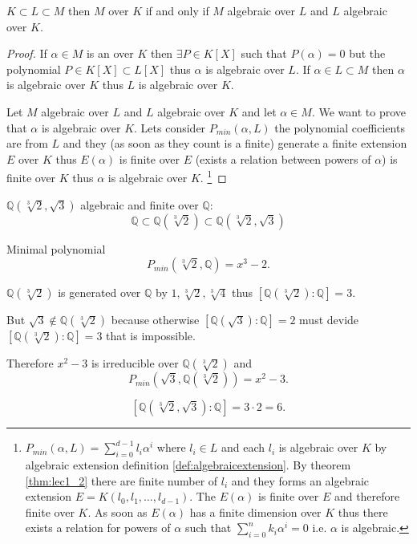 \begin{theorem}
  $K \subset L \subset M$ then $M$ 
  over $K$ if and only if $M$ algebraic over $L$ and $L$ algebraic
  over $K$. 
  \begin{proof}
    If $\alpha \in M$ is an  over $K$ then
    $\exists P \in K\left[X\right]$ such that
    $P\left(\alpha\right) = 0$ but the
    polynomial $P \in K\left[X\right] \subset L\left[X\right]$
    thus $\alpha$ is algebraic over $L$.
    If $\alpha \in L \subset M$ then $\alpha$ is algebraic over $K$
    thus $L$ is algebraic over $K$.

    Let $M$ algebraic over $L$ and $L$ algebraic over $K$ and let
    $\alpha \in M$. We want to prove that $\alpha$ is algebraic over
    $K$. Lets consider $P_{min}\left(\alpha, L\right)$ the polynomial
    coefficients are from $L$ and they (as soon as they count is a
    finite)  generate a finite extension $E$ over $K$ thus
    $E\left(\alpha\right)$ is finite over $E$ (exists a relation
    between powers of $\alpha$) is finite over $K$ thus $\alpha$ is
    algebraic over $K$.
    \footnote{
      $P_{min}\left(\alpha, L\right) = \sum_{i = 0}^{d-1} l_i
      \alpha^i$ where $l_i \in L$ and each $l_i$ is algebraic over $K$
      by algebraic extension definition
      \ref{def:algebraicextension}. By theorem
      \ref{thm:lec1_2} there are finite number of $l_i$
      and they forms an algebraic extension
      $E = K\left(l_0, l_1, \dots, l_{d-1}\right)$. The
      $E\left(\alpha\right)$ is finite over $E$ and therefore finite
      over $K$. As soon as $E\left(\alpha\right)$ has a finite
      dimension over $K$ thus there exists a relation for powers of
      $\alpha$ such that $\sum_{i=0}^n k_i \alpha^i = 0$ i.e. 
      $\alpha$ is algebraic. 
    }
  \end{proof}
\end{theorem}
\begin{example}
  $\mathbb{Q}\left( \sqrt[3]{2}, \sqrt{3}\right)$ algebraic and finite
  over $\mathbb{Q}$:
  \[
  \mathbb{Q} \subset \mathbb{Q}\left( \sqrt[3]{2}\right)
  \subset \mathbb{Q}\left( \sqrt[3]{2}, \sqrt{3}\right)
  \]

  Minimal polynomial
  \[
  P_{min}\left(\sqrt[3]{2}, \mathbb{Q}\right) = x^3 - 2.
  \]

  $\mathbb{Q}\left( \sqrt[3]{2}\right)$ is generated over $\mathbb{Q}$
  by $1, \sqrt[3]{2}, \sqrt[3]{4}$ thus
  $\left[\mathbb{Q}\left( \sqrt[3]{2}\right): \mathbb{Q}\right] = 3$.

  But $\sqrt{3} \notin \mathbb{Q}\left( \sqrt[3]{2}\right)$ because
  otherwise $\left[\mathbb{Q}\left( \sqrt{3}\right): \mathbb{Q}\right]
  = 2$ must devide  
  $\left[\mathbb{Q}\left( \sqrt[3]{2}\right): \mathbb{Q}\right] = 3$
  that is impossible.

  Therefore $x^2 - 3$ is irreducible over
  $\mathbb{Q}\left( \sqrt[3]{2}\right)$ and
  \[
  P_{min}\left(\sqrt{3}, \mathbb{Q}\left( \sqrt[3]{2}\right)\right) =
  x^2 - 3.
  \]

  \[
  \left[\mathbb{Q}\left( \sqrt[3]{2}, \sqrt{3}\right):
    \mathbb{Q}\right] = 3 \cdot 2 = 6.
  \]
\end{example}

